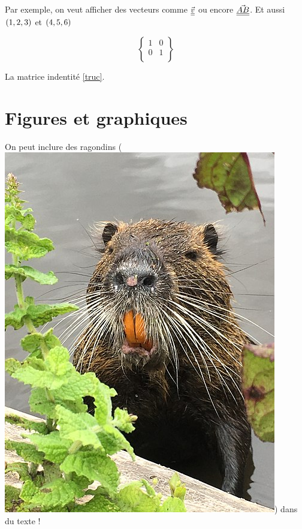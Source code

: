 \documentclass[a4paper, twoside, onecolumn, 10pt]{article}
\begin{document}
Par exemple, on veut afficher des vecteurs comme $ \vec{ \underline{\underline{v}}}$ ou encore $\vec{ \underline{\underline{AB}}}$. Et aussi $(1, 2, 3)$  et $(4, 5, 6)$

\newcommand{\labelledmatrix}[1]{\begin{equation}
\begin{Bmatrix}
1 & 0\\
0 & 1 \\
\end{Bmatrix}
\end{equation}
\label{#1}}

\labelledmatrix{truc}

La matrice indentité \ref{truc}.
\section{Figures et graphiques}


On peut inclure des ragondins (\includegraphics[scale=.1]{images/ragondin.jpg}) dans du texte !

\blindtext[10]
\end{document}
